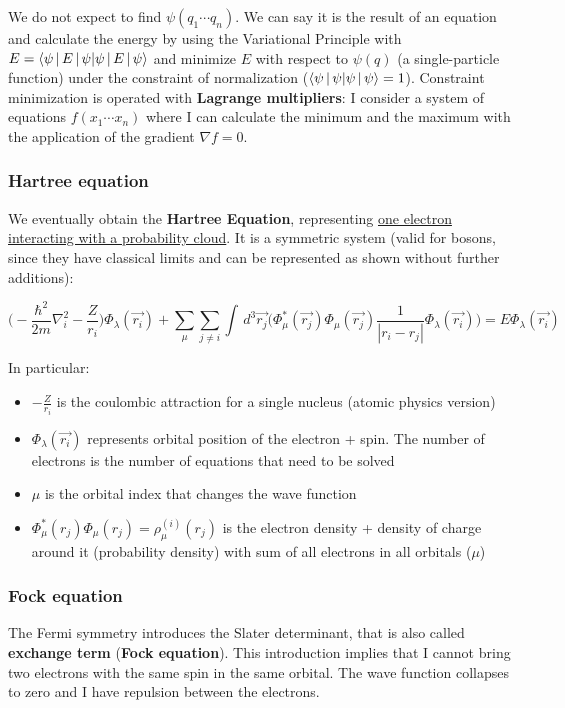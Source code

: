 		We do not expect to find $\psi(q_1\cdots q_n)$.
		We can say it is the result of an equation and calculate the energy by using the Variational Principle with $E=\braket{\psi\,|\,E\,|\,\psi}$ and minimize $E$ with respect to $\psi(q)$ (a single-particle function) under the constraint of normalization ($\braket{\psi\,|\,\psi}=1$).
		Constraint minimization is operated with \textbf{Lagrange multipliers}: I consider a system of equations $f(x_1\cdots x_n)$ where I can calculate the minimum and the maximum with the application of the gradient $\nabla f=0$.

		\subsubsection{Hartree equation}
		We eventually obtain the \textbf{Hartree Equation}, representing \ul{one electron interacting with a probability cloud}.
		It is a symmetric system (valid for bosons, since they have classical limits and can be represented as shown without further additions):

		$$\bigg(-\frac{\hbar^2}{2m}\nabla^2_i-\frac{Z}{r_i}\bigg)\Phi_\lambda(\vec{r_i})+\sum_\mu \sum_{j \neq i} \int\,d^3\vec{r_j}\bigg(\Phi^*_\mu(\vec{r_j})\Phi_\mu(\vec{r_j})\frac{1}{|r_i-r_j|}\Phi_\lambda(\vec{r_i})\bigg)=E\Phi_\lambda(\vec{r_i})$$

		In particular:

		\begin{multicols}{2}
			\begin{itemize}
				\item $-\frac{Z}{r_i}$ is the coulombic attraction for a single nucleus (atomic physics version)
				\item $\Phi_\lambda(\vec{r_i})$ represents orbital position of the electron + spin.
			The number of electrons is the number of equations that need to be solved
				\item $\mu$ is the orbital index that changes the wave function
				\item $\Phi^*_\mu(r_j)\Phi_\mu(r_j) = \rho_\mu^{(i)}(r_j)$ is the electron density + density of charge around it (probability density) with sum of all electrons in all orbitals ($\mu$)
			\end{itemize}
		\end{multicols}

		\subsubsection{Fock equation}
		The Fermi symmetry introduces the Slater determinant, that is also called \textbf{exchange term} (\textbf{Fock equation}).
		This introduction implies that I cannot bring two electrons with the same spin in the same orbital.
		The wave function collapses to zero and I have repulsion between the electrons.

